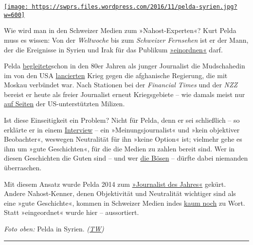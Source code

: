 \href{https://swprs.org/2017/03/01/der-kriegsreporter/}{\texttt{[image: https://swprs.files.wordpress.com/2016/11/pelda-syrien.jpg?w=600]}}

Wie wird man in den Schweizer Medien zum »Nahost-Experten«? Kurt Pelda
muss es wissen: Von der \emph{Welt­woche} bis zum \emph{Schwei­zer
Fern­se­hen} ist er der Mann, der die Ereig­nisse in Sy­ri­en und Irak
für das Publi­kum
\href{http://www.srf.ch/news/international/assad-ist-nur-noch-an-der-macht-weil-er-so-brutal-ist}{»ein­ord­nen«}
darf.

Pelda
\href{https://www.youtube.com/watch?v=dtV25eIECKY}{be­glei­tete}schon in
den 80er Jahren als junger Journa­list die Mudschahedin im von den USA
\href{https://www.voltairenet.org/article165889.html}{lancier­ten} Krieg
gegen die afgha­nische Regie­rung, die mit Moskau verbün­det war. Nach
Sta­tionen bei der \emph{Financial Times} und der \emph{NZZ} bereist er
heute als freier Journa­list erneut Kriegs­ge­biete -- wie damals meist
nur
\href{https://tageswoche.ch/politik/ein-basler-im-syrischen-kampfgebiet/}{auf
Seiten} der US-unter­stützten Milizen.

Ist diese Ein­seitig­keit ein Pro­blem? Nicht für Pelda, denn er sei
schließ­lich -- so erklärte er in einem
\href{https://www.tageswoche.ch/de/2014_36/international/667493/}{Interview}
-- ein »Mei­nungs­jour­na­list« und »kein objek­ti­ver Be­obach­ter«,
wes­wegen Neutra­li­tät für ihn »keine Option« ist; viel­mehr gehe es
ihm um »gute Ge­schich­ten«, für die die Medien zu zahlen be­reit sind.
Wer in diesen Ge­schich­ten die Guten sind -- und wer
\href{http://www.srf.ch/news/international/assad-ist-nur-noch-an-der-macht-weil-er-so-brutal-ist}{die
Bösen} -- dürf‌te dabei niemanden über­raschen.

Mit diesem Ansatz wurde Pelda 2014 zum
\href{http://www.srf.ch/news/panorama/kurt-pelda-ist-journalist-des-jahres}{»Jour­na­list
des Jahres«} gekürt. Andere Nahost-Ken­ner, denen Objek­ti­vi­tät und
Neutra­lität wich­ti­ger sind als eine »gute Ge­schichte«, kommen in
Schwei­zer Medien indes
\href{https://swprs.org/das-gewuenschte-narrativ-ii/}{kaum noch} zu
Wort. Statt »ein­ge­ordnet« wurde hier -- aus­sor­tiert.

\emph{Foto oben:} Pelda in Syrien.
\emph{(\href{https://tageswoche.ch/politik/ein-basler-im-syrischen-kampfgebiet/}{TW})}

\begin{center}\rule{0.5\linewidth}{\linethickness}\end{center}

